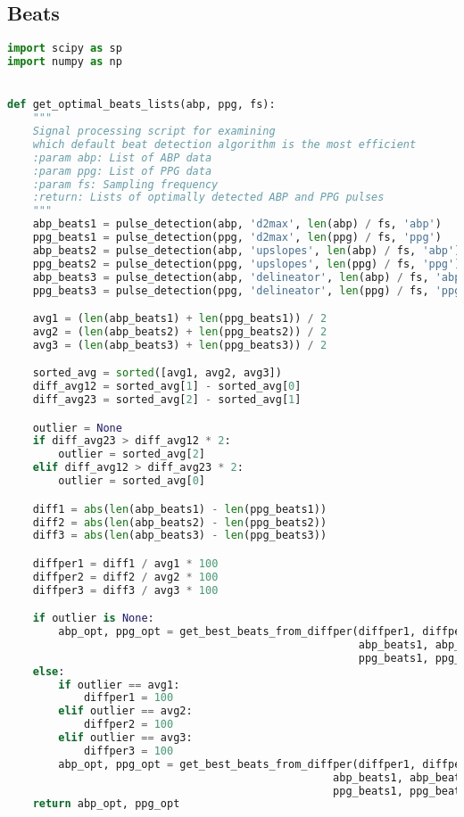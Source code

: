 \newpage

\subsection{Beats}
\label{subsec:code_beats}

\begin{lstlisting}[language=Python,label={lst:beats.py}, basicstyle=\scriptsize]
import scipy as sp
import numpy as np


def get_optimal_beats_lists(abp, ppg, fs):
    """
    Signal processing script for examining
    which default beat detection algorithm is the most efficient
    :param abp: List of ABP data
    :param ppg: List of PPG data
    :param fs: Sampling frequency
    :return: Lists of optimally detected ABP and PPG pulses
    """
    abp_beats1 = pulse_detection(abp, 'd2max', len(abp) / fs, 'abp')
    ppg_beats1 = pulse_detection(ppg, 'd2max', len(ppg) / fs, 'ppg')
    abp_beats2 = pulse_detection(abp, 'upslopes', len(abp) / fs, 'abp')
    ppg_beats2 = pulse_detection(ppg, 'upslopes', len(ppg) / fs, 'ppg')
    abp_beats3 = pulse_detection(abp, 'delineator', len(abp) / fs, 'abp')
    ppg_beats3 = pulse_detection(ppg, 'delineator', len(ppg) / fs, 'ppg')

    avg1 = (len(abp_beats1) + len(ppg_beats1)) / 2
    avg2 = (len(abp_beats2) + len(ppg_beats2)) / 2
    avg3 = (len(abp_beats3) + len(ppg_beats3)) / 2

    sorted_avg = sorted([avg1, avg2, avg3])
    diff_avg12 = sorted_avg[1] - sorted_avg[0]
    diff_avg23 = sorted_avg[2] - sorted_avg[1]

    outlier = None
    if diff_avg23 > diff_avg12 * 2:
        outlier = sorted_avg[2]
    elif diff_avg12 > diff_avg23 * 2:
        outlier = sorted_avg[0]

    diff1 = abs(len(abp_beats1) - len(ppg_beats1))
    diff2 = abs(len(abp_beats2) - len(ppg_beats2))
    diff3 = abs(len(abp_beats3) - len(ppg_beats3))

    diffper1 = diff1 / avg1 * 100
    diffper2 = diff2 / avg2 * 100
    diffper3 = diff3 / avg3 * 100

    if outlier is None:
        abp_opt, ppg_opt = get_best_beats_from_diffper(diffper1, diffper2, diffper3,
                                                       abp_beats1, abp_beats2, abp_beats3,
                                                       ppg_beats1, ppg_beats2, ppg_beats3)
    else:
        if outlier == avg1:
            diffper1 = 100
        elif outlier == avg2:
            diffper2 = 100
        elif outlier == avg3:
            diffper3 = 100
        abp_opt, ppg_opt = get_best_beats_from_diffper(diffper1, diffper2, diffper3,
                                                   abp_beats1, abp_beats2, abp_beats3,
                                                   ppg_beats1, ppg_beats2, ppg_beats3)
    return abp_opt, ppg_opt



\end{lstlisting}
